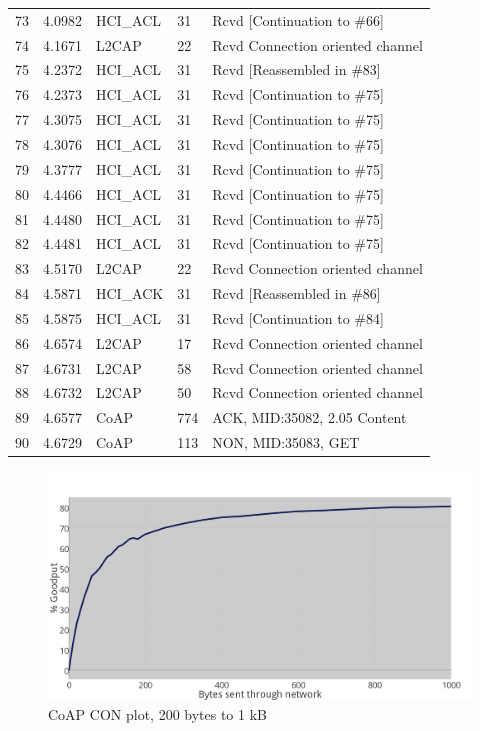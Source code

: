 \begin{table}[H]
\begin{tabular}{lllll}
73     & 4.0982  & HCI\_ACL & 31     & Rcvd {[}Continuation to \#66{]}  \\
74     & 4.1671  & L2CAP    & 22     & Rcvd Connection oriented channel \\
75     & 4.2372  & HCI\_ACL & 31     & Rcvd {[}Reassembled in \#83{]}   \\
76     & 4.2373  & HCI\_ACL & 31     & Rcvd {[}Continuation to \#75{]}  \\
77     & 4.3075  & HCI\_ACL & 31     & Rcvd {[}Continuation to \#75{]}  \\
78     & 4.3076  & HCI\_ACL & 31     & Rcvd {[}Continuation to \#75{]}  \\
79     & 4.3777  & HCI\_ACL & 31     & Rcvd {[}Continuation to \#75{]}  \\
80     & 4.4466  & HCI\_ACL & 31     & Rcvd {[}Continuation to \#75{]}  \\
81     & 4.4480  & HCI\_ACL & 31     & Rcvd {[}Continuation to \#75{]}  \\
82     & 4.4481  & HCI\_ACL & 31     & Rcvd {[}Continuation to \#75{]}  \\
83     & 4.5170  & L2CAP    & 22     & Rcvd Connection oriented channel \\
84     & 4.5871  & HCI\_ACK & 31     & Rcvd {[}Reassembled in \#86{]}   \\
85     & 4.5875  & HCI\_ACL & 31     & Rcvd {[}Continuation to \#84{]}  \\
86     & 4.6574  & L2CAP    & 17     & Rcvd Connection oriented channel \\
87     & 4.6731  & L2CAP    & 58     & Rcvd Connection oriented channel \\
88     & 4.6732  & L2CAP    & 50     & Rcvd Connection oriented channel \\
89     & 4.6577  & CoAP     & 774    & ACK, MID:35082, 2.05 Content     \\
90     & 4.6729  & CoAP     & 113    & NON, MID:35083, GET              \\ \hline
\end{tabular}
\end{table}


\newpage

\begin{figure}[ht]
    \centering
    \includegraphics[width=\textwidth]{CON0toK_thickerGRAY.png}    
    \caption{CoAP CON plot, 200 bytes to 1 kB}
    \label{fig:plotCoAPCON200toK}
\end{figure}

